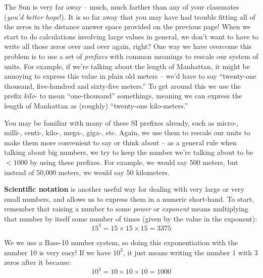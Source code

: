 \documentclass[12pt]{article}
\begin{document}

\clearpage

The Sun is very far away -- much, much farther than any of your classmates (\textit{you'd better hope}!). It is so far away that you may have had trouble fitting all of the zeros in the distance answer space provided on the previous page! When we start to do calculations involving large values in general, we don't want to have to write all those zeros over and over again, right? One way we have overcome this problem is to use a set of \textit{prefixes} with common meanings to rescale our system of units. For example, if we're talking about the length of Manhattan, it might be annoying to express this value in plain old meters -- we'd have to say ``twenty-one thousand, five-hundred and sixty-five meters.'' To get around this we use the prefix \textit{kilo-} to mean ``one-thousand'' somethings, meaning we can express the length of Manhattan as (roughly) ``twenty-one kilo-meters.''

You may be familiar with many of these SI prefixes already, such as micro-, milli-, centi-, kilo-, mega-, giga-, etc. Again, we use them to rescale our units to make them more convenient to say or think about -- as a general rule when talking about big numbers, we try to keep the number we're talking about to be $<1000$ by using these prefixes. For example, we would say 500 meters, but instead of 50,000 meters, we would say 50 kilometers.

\textbf{Scientific notation} is another useful way for dealing with very large or very small numbers, and allows us to express them in a numeric short-hand. To start, remember that raising a number to some \textit{power} or \textit{exponent} means multiplying that number by itself some number of times (given by the value in the exponent): 
\begin{equation*}
	15^3 = 15\times15\times15 = 3375
\end{equation*}

We we use a Base-10 number system, so doing this exponentiation with the number 10 is very easy! If we have $10^3$, it just means writing the number 1 with 3 zeros after it because:
\begin{equation*}
	10^3 = 10\times10\times10 = 1000
\end{equation*}
\end{document}
